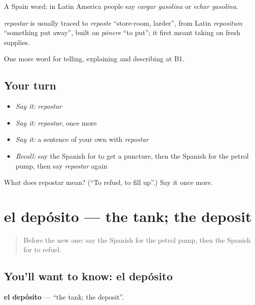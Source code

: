 A Spain word; in Latin America people say \emph{cargar gasolina} or \emph{echar gasolina}.

\begin{cousinweb}
\emph{repostar} is usually traced to \emph{reposte} \textquotedblleft{}store-room, larder\textquotedblright{}, from Latin \emph{repositum} \textquotedblleft{}something put away\textquotedblright{}, built on \emph{pōnere} \textquotedblleft{}to put\textquotedblright{}; it first meant taking on fresh supplies.
\end{cousinweb}

\begin{grammarlens}[title={What you've built}]
One more word for telling, explaining and describing at B1.
\end{grammarlens}

\subsection*{Your turn}
\begin{itemize}
\raggedright
  \item \emph{Say it:} \emph{repostar}
  \item \emph{Say it:} \emph{repostar}, once more
  \item \emph{Say it:} a sentence of your own with \emph{repostar}
  \item \emph{Recall:} say the Spanish for to get a puncture, then the Spanish for the petrol pump, then say \emph{repostar} again
\end{itemize}

\begin{tcolorbox}[breakable,colback=teal!4,colframe=teal!35!black,title={Before you move on}]
What does repostar mean? (\textquotedblleft{}To refuel, to fill up\textquotedblright{}.) Say it once more.
\end{tcolorbox}
\section[el depósito]{el depósito — the tank; the deposit}

\label{lesson:ES-C646-deposito}



\begin{quote}
Before the new one: say the Spanish for the petrol pump, then the Spanish for to refuel.
\end{quote}

\subsection*{You'll want to know: el depósito}
\textbf{el depósito} — \textquotedblleft{}the tank; the deposit\textquotedblright{}.


